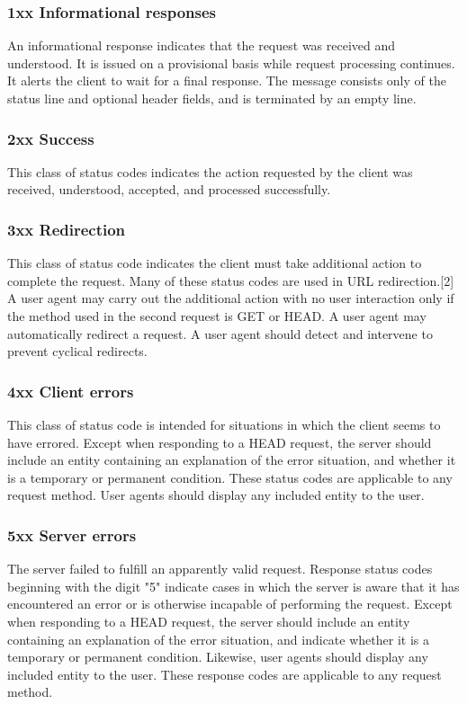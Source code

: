 \subsubsection{1xx Informational responses}
An informational response indicates that the request was received and understood. It is issued on a provisional basis while request processing continues. It alerts the client to wait for a final response. The message consists only of the status line and optional header fields, and is terminated by an empty line.

\subsubsection{2xx Success}
This class of status codes indicates the action requested by the client was received, understood, accepted, and processed successfully.

\subsubsection{3xx Redirection}
This class of status code indicates the client must take additional action to complete the request. Many of these status codes are used in URL redirection.[2]
A user agent may carry out the additional action with no user interaction only if the method used in the second request is GET or HEAD. A user agent may automatically redirect a request. A user agent should detect and intervene to prevent cyclical redirects.

\subsubsection{4xx Client errors}
This class of status code is intended for situations in which the client seems to have errored. Except when responding to a HEAD request, the server should include an entity containing an explanation of the error situation, and whether it is a temporary or permanent condition. These status codes are applicable to any request method. User agents should display any included entity to the user.

\subsubsection{5xx Server errors}
The server failed to fulfill an apparently valid request. Response status codes beginning with the digit "5" indicate cases in which the server is aware that it has encountered an error or is otherwise incapable of performing the request. Except when responding to a HEAD request, the server should include an entity containing an explanation of the error situation, and indicate whether it is a temporary or permanent condition. Likewise, user agents should display any included entity to the user. These response codes are applicable to any request method.




